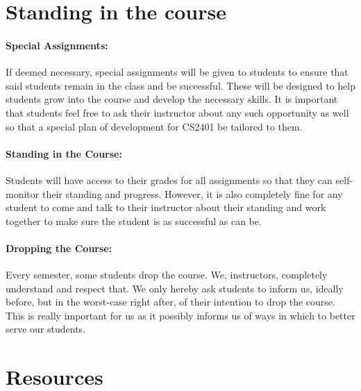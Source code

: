 \documentclass[12pt]{scrartcl}
\newcommand{\change}[2]{#2}
\begin{document}
\section{Standing in the course}

\paragraph{Special Assignments:} 
\change{will be given to students i}{I}f deemed necessary, \change{which will need to be completed}{special assignments will be given to students} to ensure that said students remain in the class and be successful. 
These will be designed to help students grow into the course and develop the necessary skills.
It is important that students feel free to ask their instructor about any such opportunity as well so that a special plan of development for CS2401 be tailored to them.

\paragraph{Standing in the Course:} 

Students will have access to their grades for all assignments so that they can self-monitor their standing and progress. 
However, it is also completely fine for any student to come and talk to their instructor about their standing and work together to make sure the student is as successful as can be.

\paragraph{Dropping the Course:} 
Every semester, some students drop the course. We, instructors, completely understand and respect that. We only hereby ask students to inform us, ideally before, but in the worst-case right after, of their intention to drop the course. This is really important for us as it possibly informs us of ways in which to better serve our students.


\section{Resources}
\end{document}
